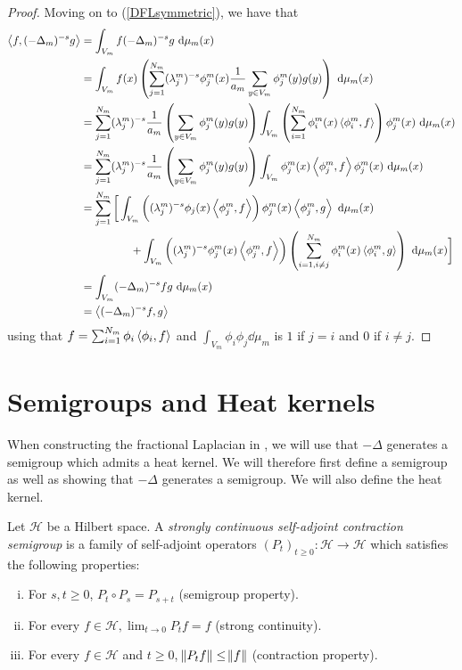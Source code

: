 \begin{proof}
	Moving on to (\ref{DFLsymmetric}), we have that
	\begin{align}
		\inn{f}{(-\Delta_{m})^{-s}g} & = \int_{V_m} f (-\Delta_{m})^{-s}g \dd \mu_m(x) \\
		&= \int_{V_m} f(x) \left(\sum_{j = 1}^{N_m} (\lambda_{j}^{m})^{-s} \phi_{j}^{m}(x) \frac{1}{a_m} \sum_{y \in V_m} \phi_{j}^{m}(y)g(y)\right) \dd \mu_m(x) \\
		&= \sum_{j = 1}^{N_m} (\lambda_{j}^{m})^{-s} \frac{1}{a_m} \left(\sum_{y \in V_m} \phi_{j}^{m}(y)g(y) \right)\int_{V_m} \left(\sum_{i =1}^{N_m}\phi^{m}_i(x) \inn{\phi^{m}_i}{f} \right) \phi^{m}_j(x) \dd \mu_m(x) \\
		&=\sum_{j = 1}^{N_m} (\lambda_{j}^{m})^{-s} \frac{1}{a_m} \left(\sum_{y \in V_m} \phi_{j}^{m}(y)g(y)\right) \int_{V_m} \phi^{m}_j(x) \inn{\phi^{m}_j}{f} \phi^{m}_j(x) \dd \mu_m(x) \\
		& = \sum_{j = 1}^{N_m} \bigg[ \int_{V_m} \left((\lambda_j^{m})^{-s} \phi_j(x) \inn{\phi_j^{m}}{f}\right) \phi_j^{m}(x) \inn{\phi_j^{m}}{g} \dd \mu_m(x) \\
		&\phantom{a} \qquad \qquad + \int_{V_m} \left((\lambda^{m}_{j})^{-s} \phi_j^{m}(x)\inn{\phi_j^{m}}{f} \right) \left(\sum_{i = 1, i \neq j}^{N_m} \phi_i^{m}(x) \inn{\phi_i^{m}}{g}\right) \dd \mu_m(x)\bigg] \\
		&= \int_{V_m} (-\Delta_{m})^{-s}f g \dd \mu_m(x) \\
		&=\inn{(-\Delta_{m})^{-s}f}{g}
	\end{align}
	using that $f = \sum_{i =1}^{N_m}\phi_i \inn{\phi_i}{f}$ and $\int_{V_m}\phi_i \phi_j \dd \mu_m$ is $1$ if $j = i$ and $0$ if $i \neq j$.
\end{proof}


\section{Semigroups and Heat kernels}
When constructing the fractional Laplacian in , we will use that $-\Delta$ generates a semigroup which admits a heat kernel. We will therefore first define a semigroup as well as showing that $-\Delta$ generates a semigroup. We will also define the heat kernel.

\begin{defi}\label{semigroupDef}
	Let $\mathcal{H}$ be a Hilbert space. A \emph{strongly continuous self-adjoint contraction semigroup} is a family of self-adjoint operators $(P_t)_{t \geq 0}\colon \mathcal{H} \to \mathcal{H}$ which satisfies the following properties:
	\begin{enumerate}[(i)]
		\item For $s,t \geq 0$, $P_t \circ P_s = P_{s +t}$ (semigroup property). \label{semigroup}
		\item For every $f \in \mathcal{H}, \lim_{t \to 0} P_t f= f$ (strong continuity).\label{strong cont}
		\item For every $f \in \mathcal{H}$ and $t \geq 0$, $\norm{P_t f} \leq \norm{f}$ (contraction property). \label{semigroup contraction}
	\end{enumerate}
\end{defi}

